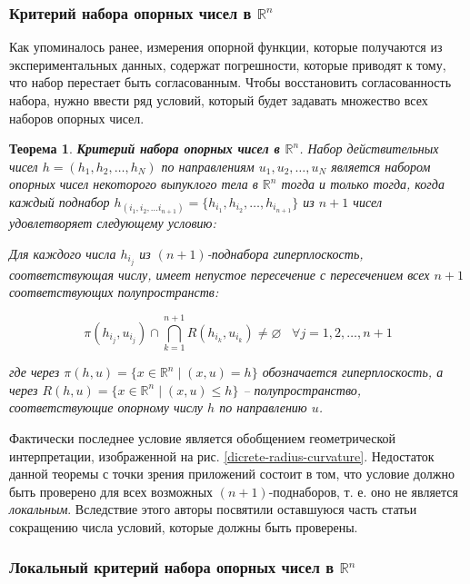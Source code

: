 \documentclass[a4paper, 12pt, titlepage]{article}
\theoremstyle{definition}
\theoremstyle{plain}
\newtheorem{SmartTheorem}{Теорема}
\theoremstyle{plain}
\begin{document}
\subsubsection{Критерий набора опорных чисел в $\mathbb{R}^{n}$}

Как упоминалось ранее, измерения опорной функции, которые получаются из
экспериментальных данных, содержат погрешности, которые приводят к тому, что
набор перестает быть согласованным. Чтобы восстановить согласованность набора,
нужно ввести ряд условий, который будет задавать множество всех наборов опорных
чисел.

\begin{SmartTheorem}
 \label{thm:discrete-consistency}
 \textbf{Критерий набора опорных чисел в $\mathbb{R}^{n}$}.
 Набор действительных чисел $h = (h_{1}, h_{2}, \ldots, h_{N})$ по
 направлениям $u_{1}, u_{2}, \ldots, u_{N}$ является набором  опорных чисел
 некоторого выпуклого тела в $\mathbb{R}^{n}$ тогда и только тогда, когда
 каждый поднабор $h_{(i_{1}, i_{2}, \ldots i_{n + 1})} = \{h_{i_{1}}, h_{i_{2}},
 \ldots, h_{i_{n + 1}}\}$ из $n + 1$ чисел удовлетворяет следующему условию:

 Для каждого числа $h_{i_{j}}$ из $(n + 1)$-поднабора гиперплоскость,
 соответствующая числу, имеет непустое пересечение с пересечением всех $n + 1$
 соответствующих полупространств:

 \begin{equation}
 \label{thm:discrete-consistency:condition}
  \pi(h_{i_{j}}, u_{i_{j}}) \cap \bigcap \limits_{k = 1}^{n + 1} R(h_{i_{k}},
  u_{i_{k}}) \neq \varnothing \;\;\; \forall j = 1, 2, \ldots, n + 1
 \end{equation}

 где через
 $\pi(h, u) = \{x \in \mathbb{R}^{n} \; | \; (x, u) = h\}$
 обозначается  гиперплоскость, а через
 $R(h, u) = \{x \in \mathbb{R}^{n} \; | \; (x, u) \leq h\}$
 -- полупространство, соответствующие опорному числу $h$ по направлению $u$.
\end{SmartTheorem}

Фактически последнее условие является обобщением геометрической интерпретации,
изображенной на рис. \ref{dicrete-radius-curvature}. Недостаток данной теоремы
с точки зрения приложений состоит в том, что условие должно быть проверено для
всех возможных $(n + 1)$-поднаборов, т. е. оно не является \textit{локальным}.
Вследствие этого авторы посвятили оставшуюся часть статьи сокращению числа
условий, которые должны быть проверены.

\subsubsection{Локальный критерий набора опорных чисел в $\mathbb{R}^{n}$}
\end{document}
